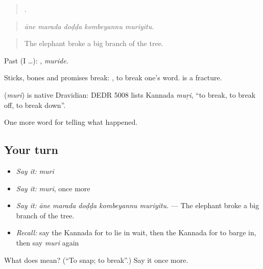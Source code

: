 \begin{quote}
    .
\end{quote}

\begin{quote}
\emph{āne marada doḍḍa kombeyannu muriyitu.}
\end{quote}

\begin{quote}
The elephant broke a big branch of the tree.
\end{quote}

Past (I …): , \emph{muride}.

Sticks, bones and promises break:  , to break one's word.  is a fracture.

\begin{cousinweb}
\textbf{} (\emph{muri}) is native Dravidian: DEDR 5008 lists Kannada \emph{muṟi}, \textquotedblleft{}to break, to break off, to break down\textquotedblright{}.
\end{cousinweb}

\begin{grammarlens}[title={What you've built}]
One more word for telling what happened.
\end{grammarlens}

\subsection*{Your turn}
\begin{itemize}
\raggedright
  \item \emph{Say it:} \emph{muri}
  \item \emph{Say it:} \emph{muri}, once more
  \item \emph{Say it:} \emph{āne marada doḍḍa kombeyannu muriyitu.} — The elephant broke a big branch of the tree.
  \item \emph{Recall:} say the Kannada for to lie in wait, then the Kannada for to barge in, then say \emph{muri} again
\end{itemize}

\begin{tcolorbox}[breakable,colback=teal!4,colframe=teal!35!black,title={Before you move on}]
What does  mean? (\textquotedblleft{}To snap; to break\textquotedblright{}.) Say it once more.
\end{tcolorbox}
